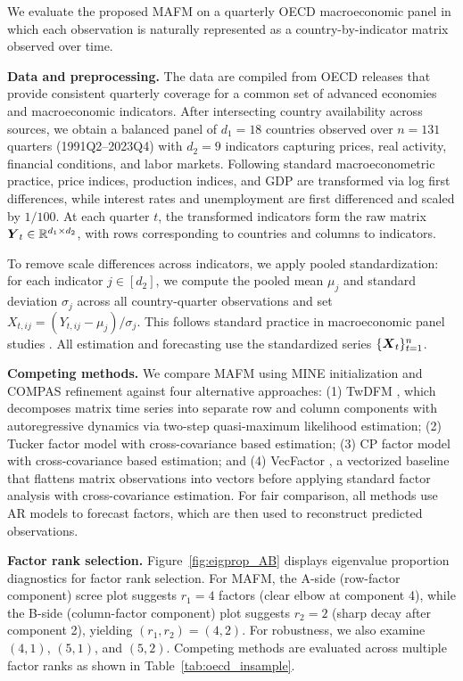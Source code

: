 \documentclass[11pt,letterpaper]{article}
\theoremstyle{definition}
\begin{document}
We evaluate the proposed MAFM on a quarterly OECD macroeconomic panel in which each observation is naturally represented as a country-by-indicator matrix observed over time.

\noindent \textbf{Data and preprocessing.} 
The data are compiled from OECD releases that provide consistent quarterly coverage for a common set of advanced economies and macroeconomic indicators. After intersecting country availability across sources, we obtain a balanced panel of $d_1 = 18$ countries observed over $n=131$ quarters (1991Q2–2023Q4) with $d_2 = 9$ indicators capturing prices, real activity, financial conditions, and labor markets. Following standard macroeconometric practice, price indices, production indices, and GDP are transformed via log first differences, while interest rates and unemployment are first differenced and scaled by $1/100$. At each quarter $t$, the transformed indicators form the raw matrix $\boldsymbol{Y}_t \in \mathbb{R}^{d_1 \times d_2}$, with rows corresponding to countries and columns to indicators.


To remove scale differences across indicators, we apply pooled standardization: for each indicator $j\in[d_2]$, we compute the pooled mean $\mu_j$ and standard deviation $\sigma_j$ across all country-quarter observations and set $X_{t,ij} = (Y_{t,ij}-\mu_j)/\sigma_j$. This follows standard practice in macroeconomic panel studies \citep{ottinger2025history}. All estimation and forecasting use the standardized series $\{\boldsymbol{X}_t\}_{t=1}^n$.






\noindent \textbf{Competing methods.} 
We compare MAFM using MINE initialization and COMPAS refinement against four alternative approaches: (1) TwDFM \citep{yuan2023twoway}, which decomposes matrix time series into separate row and column components with autoregressive dynamics via two-step quasi-maximum likelihood estimation; (2) Tucker factor model \citep{han2024tensor} with cross-covariance based estimation; (3) CP factor model \citep{chen2026estimation} with cross-covariance based estimation; and (4) VecFactor \citep{bai2003inferential}, a vectorized baseline that flattens matrix observations into vectors before applying standard factor analysis with cross-covariance estimation. For fair comparison, all methods use AR models to forecast factors, which are then used to reconstruct predicted observations.




\noindent \textbf{Factor rank selection.} Figure~\ref{fig:eigprop_AB} displays eigenvalue proportion diagnostics for factor rank selection. For MAFM, the A-side (row-factor component) scree plot suggests $r_1=4$ factors (clear elbow at component 4), while the B-side (column-factor component) plot suggests $r_2 = 2$ (sharp decay after component 2), yielding $(r_1, r_2) = (4, 2)$. For robustness, we also examine $(4, 1)$, $(5, 1)$, and $(5, 2)$. Competing methods are evaluated across multiple factor ranks as shown in Table~\ref{tab:oecd_insample}.
\end{document}
